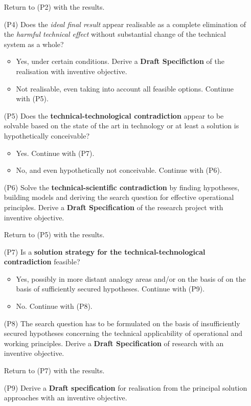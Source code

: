 \documentclass[12pt,a4paper]{article}
\begin{document}
\begin{itemize}[leftmargin=30pt,itemsep=6pt]
  Return to (P2) with the results.
\item[(P4)] Does the \emph{ideal final result} appear realisable as a complete
  elimination of the \emph{harmful technical effect} without substantial
  change of the technical system as a whole?
  \begin{itemize}
  \item Yes, under certain conditions.  Derive a \textbf{Draft Specifiction}
    of the realisation with inventive objective.
  \item Not realisable, even taking into account all feasible options.
    Continue with (P5).
  \end{itemize}
\item[(P5)] Does the \textbf{technical-technological contradiction} appear to
  be solvable based on the state of the art in technology or at least a
  solution is hypothetically conceivable?
  \begin{itemize}
  \item Yes.  Continue with (P7). 
  \item No, and even hypothetically not conceivable.  Continue with (P6).
  \end{itemize}
\item[(P6)] Solve the \textbf{technical-scientific contradiction} by finding
  hypotheses, building models and deriving the search question for effective
  operational principles.  Derive a \textbf{Draft Specification} of the
  research project with inventive objective.

  Return to (P5) with the results.
\newpage
\item[(P7)] Is a \textbf{solution strategy for the technical-technological
  contradiction} feasible? 
  \begin{itemize}
  \item Yes, possibly in more distant analogy areas and/or on the basis of on
    the basis of sufficiently secured hypotheses. Continue with (P9).
  \item No. Continue with (P8).
  \end{itemize}
\item[(P8)] The search question has to be formulated on the basis of
  insufficiently secured hypotheses concerning the technical applicability of
  operational and working principles.  Derive a \textbf{Draft Specification}
  of research with an inventive objective.

  Return to (P7) with the results.
\item[(P9)] Derive a \textbf{Draft specification} for realisation from the
  principal solution approaches with an inventive objective.
\end{itemize}

\ccnotice
\end{document}
